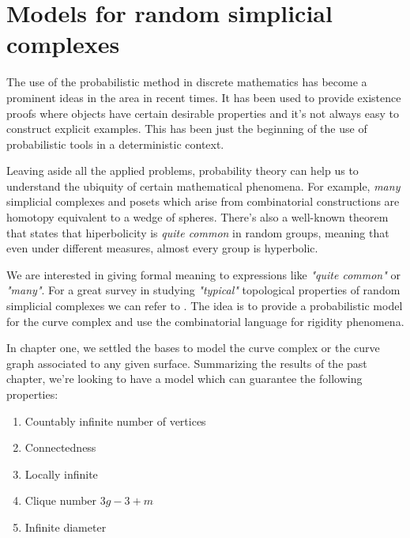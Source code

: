 
\chapter{Models for random simplicial complexes} %

\label{Chapter2} %



The use of the probabilistic method in discrete mathematics has become a prominent ideas in the area in recent times. It has been used to provide existence proofs where objects have certain desirable properties and it's not always easy to construct explicit examples. This has been just the beginning of the use of probabilistic tools in a deterministic context.

Leaving aside all the applied problems, probability theory can help us to understand the ubiquity of certain mathematical phenomena. For example, \textit{many} simplicial complexes and posets which arise from combinatorial constructions are homotopy equivalent to a wedge of spheres. There's also a well-known theorem that states that hiperbolicity is \textit{quite common} in random groups, meaning that even under different measures, almost every group is hyperbolic.

We are interested in giving formal meaning to expressions like \textit{"quite common"} or \textit{"many"}. For a great survey in
studying \textit{"typical"} topological properties of random simplicial complexes we can refer to \cite[M. Khale]{surveyStochastic}. The idea is to provide a probabilistic model for the curve complex and use the combinatorial language for rigidity phenomena. 

In chapter one, we settled the bases to model the curve complex or the curve graph associated to any given surface. Summarizing the results of the past chapter, we're looking to have a model which can guarantee the following properties:

\begin{enumerate}
\item Countably infinite number of vertices
\item Connectedness
\item Locally infinite
\item Clique number $3g-3+m$
\item Infinite diameter
\end{enumerate}

